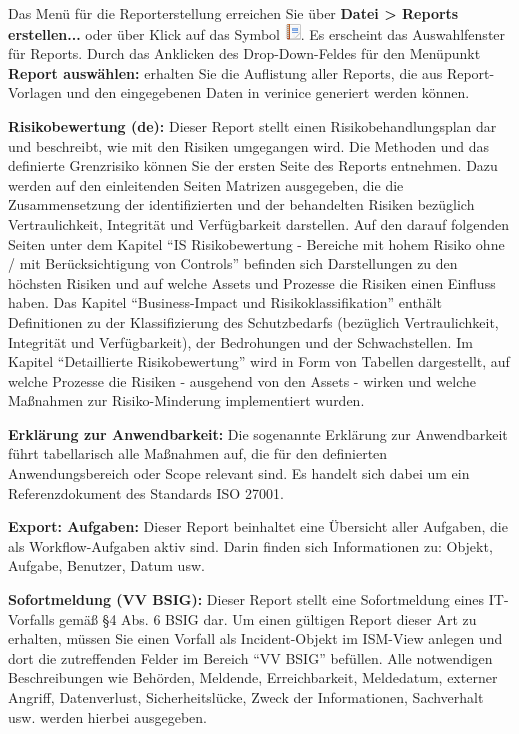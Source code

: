 \documentclass[a4paper,10pt]{book}
\begin{document}
Das Menü für die Reporterstellung erreichen Sie über \textbf{Datei \textgreater
Reports erstellen...} oder über Klick auf das Symbol
\includegraphics[height=2ex]{Icon/Report.png}. Es erscheint das Auswahlfenster
für Reports. Durch das Anklicken des Drop-Down-Feldes für den Menüpunkt
\textbf{Report auswählen:} erhalten Sie die Auflistung aller Reports, die aus
Report-Vorlagen und den eingegebenen Daten in verinice generiert werden können.

\textbf{Risikobewertung (de):} Dieser Report stellt einen Risikobehandlungsplan
dar und beschreibt, wie mit den Risiken umgegangen wird. Die Methoden und das
definierte Grenzrisiko können Sie der ersten Seite des Reports entnehmen. Dazu
werden auf den einleitenden Seiten Matrizen ausgegeben, die die Zusammensetzung
der identifizierten und der behandelten Risiken bezüglich Vertraulichkeit,
Integrität und Verfügbarkeit darstellen. Auf den darauf folgenden Seiten unter
dem Kapitel ``IS Risikobewertung - Bereiche mit hohem Risiko ohne / mit
Berücksichtigung von Controls'' befinden sich Darstellungen zu den höchsten
Risiken und auf welche Assets und Prozesse die Risiken einen Einfluss haben. Das
Kapitel ``Business-Impact und Risikoklassifikation'' enthält Definitionen zu der
Klassifizierung des Schutzbedarfs (bezüglich Vertraulichkeit, Integrität und
Verfügbarkeit), der Bedrohungen und der Schwachstellen. Im Kapitel
``Detaillierte Risikobewertung'' wird in Form von Tabellen dargestellt, auf
welche Prozesse die Risiken - ausgehend von den Assets - wirken und welche
Maßnahmen zur Risiko-Minderung implementiert wurden.

\textbf{Erklärung zur Anwendbarkeit:} Die sogenannte Erklärung zur Anwendbarkeit
führt tabellarisch alle Maßnahmen auf, die für den definierten Anwendungsbereich
oder Scope relevant sind. Es handelt sich dabei um ein Referenzdokument des
Standards ISO 27001.


\textbf{Export: Aufgaben:} Dieser Report beinhaltet eine Übersicht aller
Aufgaben, die als Workflow-Aufgaben aktiv sind. Darin finden sich Informationen
zu: Objekt, Aufgabe, Benutzer, Datum usw.

\textbf{Sofortmeldung (VV BSIG):} Dieser Report stellt eine Sofortmeldung eines
IT-Vorfalls gemäß §4 Abs. 6 BSIG dar. Um einen gültigen Report dieser Art zu
erhalten, müssen Sie einen Vorfall als Incident-Objekt im ISM-View anlegen und
dort die zutreffenden Felder im Bereich ``VV BSIG'' befüllen. Alle notwendigen
Beschreibungen wie Behörden, Meldende, Erreichbarkeit, Meldedatum, externer
Angriff, Datenverlust, Sicherheitslücke, Zweck der Informationen, Sachverhalt
usw. werden hierbei ausgegeben.
\end{document}
